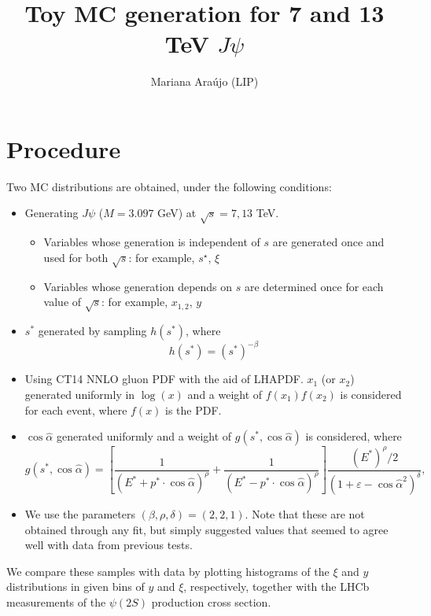 \documentclass{article}
\begin{document}
\title{Toy MC generation for 7 and 13 TeV $J\psi$}
\author{Mariana Ara\'ujo (LIP)}
\maketitle

\section{Procedure}

Two MC distributions are obtained, under the following conditions:
\begin{itemize}
\item Generating $J\psi$ ($M=3.097$ GeV) at $\sqrt{s}=7,13$ TeV.
\begin{itemize}
\item Variables whose generation is independent of $s$ are generated once and used for both $\sqrt{s}$: for example, $s^\star$, $\xi$
\item Variables whose generation depends on $s$ are determined once for each value of $\sqrt{s}$: for example, $x_{1,2}$, $y$
\end{itemize}
\item $s^*$ generated by sampling $h(s^*)$, where
$$ h(s^*) = \left(s^*\right)^{-\beta}$$
\item Using CT14 NNLO gluon PDF with the aid of LHAPDF. $x_1$ (or $x_2$) generated uniformly in $\log(x)$ and a weight of $f(x_1)f(x_2)$ is considered for each event, where $f(x)$ is the PDF.
\item $\cos\hat\alpha$ generated uniformly and a weight of $g(s^*, \cos\hat\alpha)$ is considered, where
$$g(s^*, \cos\hat\alpha) = \left[\frac{1}{(E^*+p^*\cdot\cos\hat\alpha)^\rho}+\frac{1}{(E^*-p^*\cdot\cos\hat\alpha)^\rho}\right]\frac{(E^*)^\rho/2}{(1+\varepsilon-\cos\hat\alpha^2)^\delta},$$
\item We use the parameters $(\beta, \rho, \delta) = (2, 2, 1)$. Note that these are not obtained through any fit, but simply suggested values that seemed to agree well with data from previous tests.
\end{itemize}

We compare these samples with data by plotting histograms of the $\xi$ and $y$ distributions in given bins of $y$ and $\xi$, respectively, together with the LHCb measurements of the $\psi(2S)$ production cross section.
\end{document}
